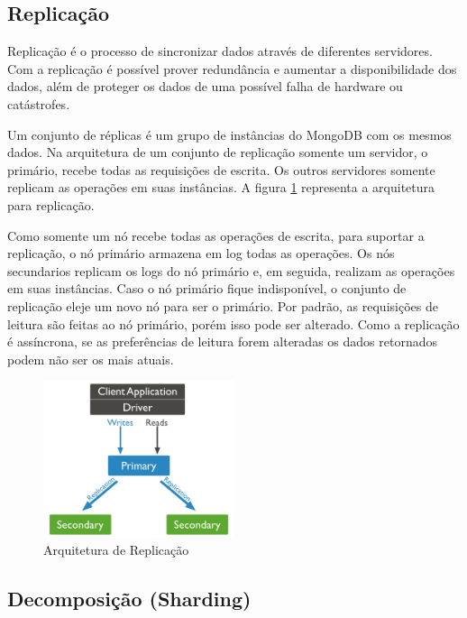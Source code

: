 \subsection{Replicação}

Replicação é o processo de sincronizar dados através de diferentes servidores. Com a replicação é possível prover redundância e aumentar a disponibilidade dos dados, além de proteger os dados de uma possível falha de hardware ou catástrofes.

Um conjunto de réplicas é um grupo de instâncias do MongoDB com os mesmos dados. Na arquitetura de um conjunto de replicação somente um servidor, o primário, recebe todas as requisições de escrita. Os outros servidores somente replicam as operações em suas instâncias. A figura \ref{fig:replication} representa a arquitetura para replicação.

Como somente um nó recebe todas as operações de escrita, para suportar a replicação, o nó primário armazena em log todas as operações. Os nós secundarios replicam os logs do nó primário e, em seguida, realizam as operações em suas instâncias. Caso o nó primário fique indisponível, o conjunto de replicação eleje um novo nó para ser o primário. Por padrão, as requisições de leitura são feitas ao nó primário, porém isso pode ser alterado. Como a replicação é assíncrona, se as preferências de leitura forem alteradas os dados retornados podem não ser os mais atuais.

	\begin{figure}[!htbp]
		\begin{center}
			\includegraphics[width=0.5\textwidth]{replication}
		\end{center}
		\caption{Arquitetura de Replicação ~\cite{sitemongodb}}
		\label{fig:replication}
	\end{figure}


\subsection{Decomposição (Sharding)}

